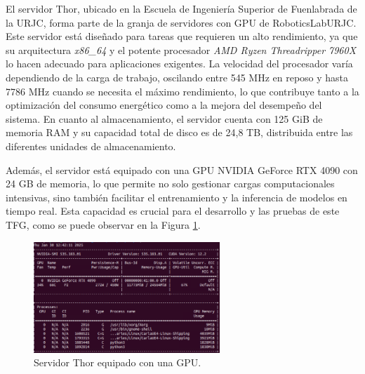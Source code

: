 El servidor Thor, ubicado en la Escuela de Ingeniería Superior de Fuenlabrada de la \ac{URJC}, forma parte de la granja de servidores con \ac{GPU} de RoboticsLabURJC. Este servidor está diseñado para tareas que requieren un alto rendimiento, ya que su arquitectura \textit{x86\_64} y el potente procesador \textit{AMD Ryzen Threadripper 7960X} lo hacen adecuado para aplicaciones exigentes. La velocidad del procesador varía dependiendo de la carga de trabajo, oscilando entre 545 MHz en reposo y hasta 7786 MHz cuando se necesita el máximo rendimiento, lo que contribuye tanto a la optimización del consumo energético como a la mejora del desempeño del sistema. En cuanto al almacenamiento, el servidor cuenta con 125 GiB de memoria \ac{RAM} y su capacidad total de disco es de 24,8 TB, distribuida entre las diferentes unidades de almacenamiento.

Además, el servidor está equipado con una \ac{GPU} NVIDIA GeForce RTX 4090 con 24 GB de memoria, lo que permite no solo gestionar cargas computacionales intensivas, sino también facilitar el entrenamiento y la inferencia de modelos en tiempo real. Esta capacidad es crucial para el desarrollo y las pruebas de este \ac{TFG}, como se puede observar en la Figura \ref{fig:thor_nvidia}.

\begin{figure}[ht]
  \centering
  \includegraphics[width=7cm]{figs/Plataformas_Desarollo/thor.png}
  \caption{Servidor Thor equipado con una \ac{GPU}.}
  \label{fig:thor_nvidia}
\end{figure}









